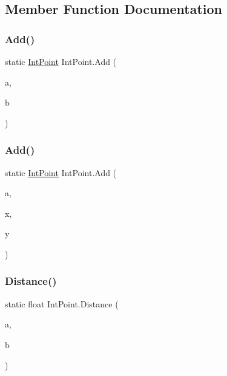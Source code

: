 \subsection{Member Function Documentation}
\mbox{\label{struct_int_point_a241b96189209f3c2036424091a910909}} 
\subsubsection{\texorpdfstring{Add()}{Add()}\hspace{0.1cm}{\footnotesize\ttfamily [1/2]}}
{\footnotesize\ttfamily static \mbox{\hyperlink{struct_int_point}{Int\+Point}} Int\+Point.\+Add (\begin{DoxyParamCaption}\item[{\mbox{\hyperlink{struct_int_point}{Int\+Point}}}]{a,  }\item[{\mbox{\hyperlink{struct_int_point}{Int\+Point}}}]{b }\end{DoxyParamCaption})\hspace{0.3cm}{\ttfamily [static]}}

\mbox{\label{struct_int_point_a4f467361e4cd5eebddeddcb9f6b8ffa4}} 
\subsubsection{\texorpdfstring{Add()}{Add()}\hspace{0.1cm}{\footnotesize\ttfamily [2/2]}}
{\footnotesize\ttfamily static \mbox{\hyperlink{struct_int_point}{Int\+Point}} Int\+Point.\+Add (\begin{DoxyParamCaption}\item[{\mbox{\hyperlink{struct_int_point}{Int\+Point}}}]{a,  }\item[{int}]{x,  }\item[{int}]{y }\end{DoxyParamCaption})\hspace{0.3cm}{\ttfamily [static]}}

\mbox{\label{struct_int_point_ad43affc9a7f25aa4bf680b756a3b81da}} 
\subsubsection{\texorpdfstring{Distance()}{Distance()}}
{\footnotesize\ttfamily static float Int\+Point.\+Distance (\begin{DoxyParamCaption}\item[{\mbox{\hyperlink{struct_int_point}{Int\+Point}}}]{a,  }\item[{\mbox{\hyperlink{struct_int_point}{Int\+Point}}}]{b }\end{DoxyParamCaption})\hspace{0.3cm}{\ttfamily [static]}}

